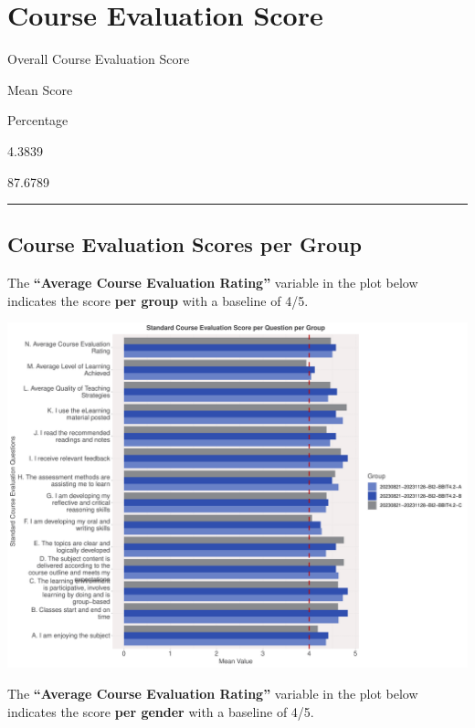 \documentclass[
]{article}
\begin{document}
\section{Course Evaluation Score}\label{course-evaluation-score}

Overall Course Evaluation Score

Mean Score

Percentage

4.3839

87.6789

\begin{center}\rule{0.5\linewidth}{0.5pt}\end{center}

\subsection{Course Evaluation Scores per
Group}\label{course-evaluation-scores-per-group}

The \textbf{``Average Course Evaluation Rating''} variable in the plot
below indicates the score \textbf{per group} with a baseline of 4/5.

\includegraphics{AnalysisOfCourseEvaluation-Notebook_files/figure-latex/VisualizationsForCourseEvaluationResultsperClassGroup-1.pdf}

\newpage

The \textbf{``Average Course Evaluation Rating''} variable in the plot
below indicates the score \textbf{per gender} with a baseline of 4/5.
\end{document}
